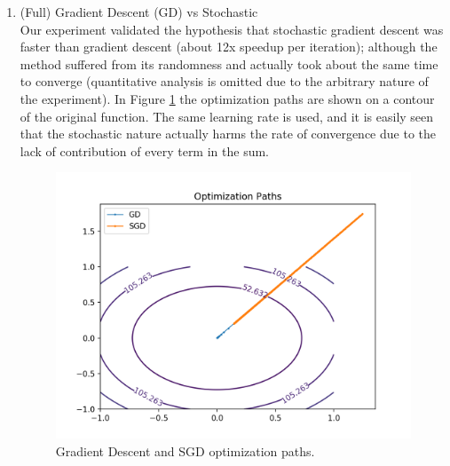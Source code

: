 \documentclass[twoside,11pt]{homework}
\DeclarePairedDelimiter{\2norm}{\lVert}{\rVert^2_2}
\newcommand{\1}[1]{\mathds{1}\left[#1\right]}
\begin{document}
\begin{enumerate}[\bf (i)]
    \begin{enumerate}
      \item (Full) Gradient Descent (GD) vs Stochastic \\
        Our experiment validated the hypothesis that stochastic gradient descent
        was faster than gradient descent (about 12x speedup per iteration);
        although the method suffered from its randomness and actually took about
        the same time to converge (quantitative analysis is omitted due to the
        arbitrary nature of the experiment). In Figure \ref{fig:sgd1} the
        optimization paths are shown on a contour of the original function. The
        same learning rate is used, and it is easily seen that the stochastic
        nature actually harms the rate of convergence due to the lack of
        contribution of every term in the sum.
       \begin{figure}[h!]
         \centering
         \includegraphics[width=6in]{img/gd-sgd.png}
         \caption{Gradient Descent and SGD optimization paths.}
         \label{fig:sgd1}
       \end{figure}


\end{enumerate}
\end{enumerate}
\end{document}

